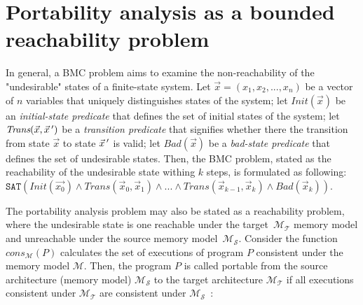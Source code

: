 

\section{Portability analysis as a bounded reachability problem}
\label{ch:enc:enc}


In general, a BMC problem aims to examine the non-reachability of the "undesirable" states of a finite-state system.
Let $\vec{x} = (x_1, x_2, ..., x_n)$ be a vector of $n$ variables that uniquely distinguishes states of the system; let $\textit{Init}(\vec{x})$ be an \textit{initial-state predicate} that defines the set of initial states of the system; let $\textit{Trans}(\vec{x}, \vec{x}\,')$ be a \textit{transition predicate} that signifies whether there the transition from state $\vec{x}$ to state $\vec{x}\,'$ is valid; let $\textit{Bad}(\vec{x})$ be a \textit{bad-state predicate} that defines the set of undesirable states.
Then, the BMC problem, stated as the reachability of the undesirable state withing $k$ steps, is formulated as following:
$\texttt{SAT}( \textit{Init}(\vec{x_0}) \land \textit{Trans}(\vec{x}_0, \vec{x}_1) \land ... \land \textit{Trans}(\vec{x}_{k-1}, \vec{x}_k) \land \textit{Bad}(\vec{x}_k) )$.

The portability analysis problem may also be stated as a reachability problem, where the undesirable state is one reachable under the target~$\mathcal{M_T}$ memory model and unreachable under the source memory model~$\mathcal{M_S}$.
Consider the function $\textit{cons}_{\mathcal{M}}(P)$ calculates the set of executions of program $P$ consistent under the memory model $\mathcal{M}$. Then, the program $P$ is called portable from the source architecture (memory model) $\mathcal{M_S}$ to the target architecture $\mathcal{M_T}$ if all executions consistent under $\mathcal{M_T}$ are consistent under $\mathcal{M_S}$~\cite{Porthos17a}:

